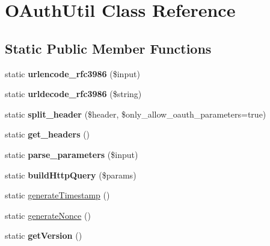 \hypertarget{class_o_auth_util}{\section{O\-Auth\-Util Class Reference}
\label{class_o_auth_util}
}
\subsection*{Static Public Member Functions}
\begin{DoxyCompactItemize}
\item 
\hypertarget{class_o_auth_util_adcb789bfefc729678d5188f05d19b5ba}{static {\bfseries urlencode\-\_\-rfc3986} (\$input)}\label{class_o_auth_util_adcb789bfefc729678d5188f05d19b5ba}

\item 
\hypertarget{class_o_auth_util_aa538116f9d9363b898929c51fc58c3d4}{static {\bfseries urldecode\-\_\-rfc3986} (\$string)}\label{class_o_auth_util_aa538116f9d9363b898929c51fc58c3d4}

\item 
\hypertarget{class_o_auth_util_a33c67362886c81064f7c21df11cf6f6f}{static {\bfseries split\-\_\-header} (\$header, \$only\-\_\-allow\-\_\-oauth\-\_\-parameters=true)}\label{class_o_auth_util_a33c67362886c81064f7c21df11cf6f6f}

\item 
\hypertarget{class_o_auth_util_a0c926e2af081c6f9c35be9792b2d7f99}{static {\bfseries get\-\_\-headers} ()}\label{class_o_auth_util_a0c926e2af081c6f9c35be9792b2d7f99}

\item 
\hypertarget{class_o_auth_util_af051ff3956c8d8d7260e15166d392947}{static {\bfseries parse\-\_\-parameters} (\$input)}\label{class_o_auth_util_af051ff3956c8d8d7260e15166d392947}

\item 
\hypertarget{class_o_auth_util_a31d15524d7216abf07e707321561e95b}{static {\bfseries build\-Http\-Query} (\$params)}\label{class_o_auth_util_a31d15524d7216abf07e707321561e95b}

\item 
static \hyperlink{class_o_auth_util_a401caaae27925f2bbaad8936b1dbdd0c}{generate\-Timestamp} ()
\item 
static \hyperlink{class_o_auth_util_a020eab4bc111168d16988e51f9529eff}{generate\-Nonce} ()
\item 
\hypertarget{class_o_auth_util_a065b5c843fd251dfa17ce20699aa149c}{static {\bfseries get\-Version} ()}\label{class_o_auth_util_a065b5c843fd251dfa17ce20699aa149c}

\end{DoxyCompactItemize}


